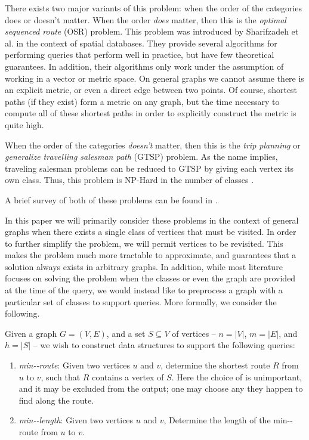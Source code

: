 \documentclass{cccg13}
\begin{document}
There exists two major variants of this problem: when the order of the categories does or doesn't matter. When the order \emph{does} matter, then this is the \emph{optimal sequenced route} (OSR) problem. This problem was introduced by Sharifzadeh et al. \cite{Sharifzadeh2008} in the context of spatial databases. They provide several algorithms for performing queries that perform well in practice, but have few theoretical guarantees. In addition, their algorithms only work under the assumption of working in a vector or metric space. On general graphs we cannot assume there is an explicit metric, or even a direct edge between two points. Of course, shortest paths (if they exist) form a metric on any graph, but the time necessary to compute all of these shortest paths in order to explicitly construct the metric is quite high.

When the order of the categories \emph{doesn't} matter, then this is the \emph{trip planning} or \emph{generalize travelling salesman path} (GTSP) problem. As the name implies, traveling salesman problems can be reduced to GTSP by giving each vertex its own class. Thus, this problem is NP-Hard in the number of classes \cite{Rice2012}. 

A brief survey of both of these problems can be found in \cite{Rice2013}. 

In this paper we will primarily consider these problems in the context of general graphs when there exists a single class of vertices that must be visited. In order to further simplify the problem, we will permit vertices to be revisited. This makes the problem much more tractable to approximate, and guarantees that a solution always exists in arbitrary graphs. In addition, while most literature focuses on solving the problem when the classes or even the graph are provided at the time of the query, we would instead like to preprocess a graph with a particular set of classes to support queries. More formally, we consider the following.

Given a graph $G=(V,E)$, and a set $S \subseteq V$ of \emph{\supplier{}} vertices -- $n = |V|$, $m = |E|$, and $h = |S|$ -- we wish to construct data structures to support the following queries: 

\begin{enumerate}
    \item \emph{min-\supplied{}-route}: Given two vertices $u$ and $v$, determine the shortest route $R$ from $u$ to $v$, such that $R$ contains a vertex of $S$. Here the choice of \supplier{} is unimportant, and it may be excluded from the output; one may choose any \supplier{} they happen to find along the route.

    \item \emph{min-\supplied{}-length}: Given two vertices $u$ and $v$, Determine the length of the min-\supplied{}-route from $u$ to $v$.
\end{enumerate}
\end{document}
